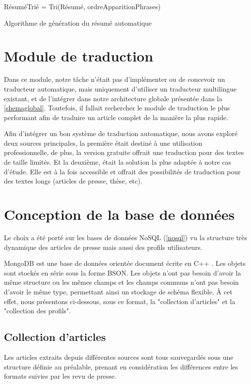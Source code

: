          \begin{algorithm2e}[H]
             \SetAlgoLined
             RésuméTrié = Tri(Résumé, ordreApparitionPhrases)\\
             \caption{Algorithme de génération du résumé automatique}
         \end{algorithm2e}

\section{Module de traduction}
Dans ce module, notre tâche n'était pas d'implémenter ou de concevoir un traducteur automatique, mais uniquement d'utiliser un traducteur multilingue existant, et de l'intégrer dans notre architecture globale présentée dans la \autoref{shemaglobal}. 
Toutefois, il fallait rechercher le module de traduction le plus performant afin de traduire un article complet de la manière la plus rapide.

Afin d'intégrer un bon système de traduction automatique, nous avons exploré deux sources principales, la première était destiné à une utilisation professionnelle, de plus, la version gratuite offrait une traduction pour des textes de taille limités. Et la deuxième, était la solution la plus adaptée à notre cas d'étude. Elle est à la fois accessible et offrait des possibilités de traduction pour des textes longs (articles de presse, thèse, etc). 


\section{Conception de la base de données}
Le choix a été porté sur les bases de données NoSQL (\autoref{nosql}) vu la structure très dynamique des articles de presse mais aussi des profils utilisateurs.

MongoDB est une base de données orientée document écrite en C++ \cite{NOSQL3}. Les objets sont stockés en série sous la forme BSON.
Les objets n'ont pas besoin d'avoir la même structure ou les mêmes champs et les champs communs n'ont pas besoin d'avoir le même type, permettant ainsi un stockage de schéma flexible. À cet effet, nous présentons ci-dessous, sous ce format, la "collection d'articles" et la "collection des profils".

\subsection{Collection d'articles}
Les articles extraits depuis différentes sources sont tous sauvegardés sous une structure définie au préalable, prenant en considération les différences entre les formats suivies par les revu de presse. 

